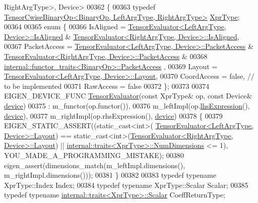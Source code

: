 \begin{DoxyCode}
      RightArgType>, Device>
00362 \{
00363   \textcolor{keyword}{typedef} \hyperlink{class_eigen_1_1_tensor_cwise_binary_op}{TensorCwiseBinaryOp<BinaryOp, LeftArgType, RightArgType>}
       \hyperlink{class_eigen_1_1_tensor_cwise_binary_op}{XprType};
00364 
00365   \textcolor{keyword}{enum} \{
00366     IsAligned = \hyperlink{struct_eigen_1_1_tensor_evaluator}{TensorEvaluator<LeftArgType, Device>::IsAligned}
       & \hyperlink{struct_eigen_1_1_tensor_evaluator}{TensorEvaluator<RightArgType, Device>::IsAligned},
00367     PacketAccess = \hyperlink{struct_eigen_1_1_tensor_evaluator}{TensorEvaluator<LeftArgType, Device>::PacketAccess}
       & \hyperlink{struct_eigen_1_1_tensor_evaluator}{TensorEvaluator<RightArgType, Device>::PacketAccess} &
00368                    \hyperlink{struct_eigen_1_1internal_1_1functor__traits}{internal::functor\_traits<BinaryOp>::PacketAccess}
      ,
00369     Layout = \hyperlink{struct_eigen_1_1_tensor_evaluator}{TensorEvaluator<LeftArgType, Device>::Layout},
00370     CoordAccess = \textcolor{keyword}{false},  \textcolor{comment}{// to be implemented}
00371     RawAccess = \textcolor{keyword}{false}
00372   \};
00373 
00374   EIGEN\_DEVICE\_FUNC \hyperlink{struct_eigen_1_1_tensor_evaluator}{TensorEvaluator}(\textcolor{keyword}{const} XprType& op, \textcolor{keyword}{const} Device& 
      \hyperlink{struct_eigen_1_1_tensor_evaluator_a98b51809ed8f7a1f736eb7b952b9636e}{device})
00375     : m\_functor(op.functor()),
00376       m\_leftImpl(op.\hyperlink{class_eigen_1_1_tensor_cwise_binary_op_abe293a3a1ee663b55c0363d2fb751397}{lhsExpression}(), \hyperlink{struct_eigen_1_1_tensor_evaluator_a98b51809ed8f7a1f736eb7b952b9636e}{device}),
00377       m\_rightImpl(op.rhsExpression(), \hyperlink{struct_eigen_1_1_tensor_evaluator_a98b51809ed8f7a1f736eb7b952b9636e}{device})
00378   \{
00379     EIGEN\_STATIC\_ASSERT((static\_cast<int>(
      \hyperlink{struct_eigen_1_1_tensor_evaluator}{TensorEvaluator<LeftArgType, Device>::Layout}) == 
      static\_cast<int>(\hyperlink{struct_eigen_1_1_tensor_evaluator}{TensorEvaluator<RightArgType, Device>::Layout}) || 
      \hyperlink{struct_eigen_1_1internal_1_1traits}{internal::traits<XprType>::NumDimensions} <= 1), 
      YOU\_MADE\_A\_PROGRAMMING\_MISTAKE);
00380     eigen\_assert(dimensions\_match(m\_leftImpl.dimensions(), m\_rightImpl.dimensions()));
00381   \}
00382 
00383   \textcolor{keyword}{typedef} \textcolor{keyword}{typename} XprType::Index Index;
00384   \textcolor{keyword}{typedef} \textcolor{keyword}{typename} XprType::Scalar Scalar;
00385   \textcolor{keyword}{typedef} \textcolor{keyword}{typename} \hyperlink{struct_eigen_1_1internal_1_1traits}{internal::traits<XprType>::Scalar} CoeffReturnType;

\end{DoxyCode}
